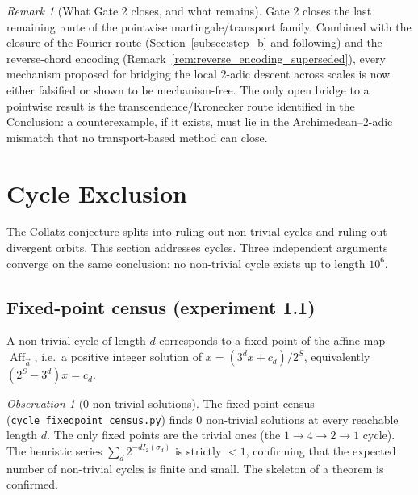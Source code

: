 \documentclass[12pt,a4paper]{article}
\theoremstyle{remark}
\newtheorem{remark}[theorem]{Remark}
\newtheorem{observation}[theorem]{Observation}
\begin{document}
\begin{remark}[What Gate 2 closes, and what remains]
Gate 2 closes the last remaining route of the pointwise martingale/transport
family. Combined with the closure of the Fourier route
(Section~\ref{subsec:step_b} and following) and the reverse-chord encoding
(Remark~\ref{rem:reverse_encoding_superseded}), every mechanism proposed for
bridging the local $2$-adic descent across scales is now either falsified or
shown to be mechanism-free. The only open bridge to a pointwise result is the
transcendence/Kronecker route identified in the Conclusion: a counterexample,
if it exists, must lie in the Archimedean--$2$-adic mismatch that no
transport-based method can close.
\end{remark}

\section{Cycle Exclusion}
\label{sec:cycle_exclusion}

The Collatz conjecture splits into ruling out non-trivial cycles and ruling out
divergent orbits. This section addresses cycles. Three independent arguments
converge on the same conclusion: no non-trivial cycle exists up to length
$10^{6}$.

\subsection{Fixed-point census (experiment 1.1)}
A non-trivial cycle of length $d$ corresponds to a fixed point of the affine
map $\operatorname{Aff}_{\vec a}$, i.e.\ a positive integer solution of
$x = (3^d x + c_d)/2^{S}$, equivalently $(2^{S}-3^{d})x = c_d$.
\begin{observation}[0 non-trivial solutions]
\label{obs:fixedpoint_census}
The fixed-point census (\texttt{cycle\_fixedpoint\_census.py}) finds $0$
non-trivial solutions at every reachable length $d$. The only fixed points are
the trivial ones (the $1\to4\to2\to1$ cycle). The heuristic series
$\sum_d 2^{-dI_2(\sigma_d)}$ is strictly $<1$, confirming that the expected
number of non-trivial cycles is finite and small. The skeleton of a theorem is
confirmed.
\end{observation}
\end{document}
